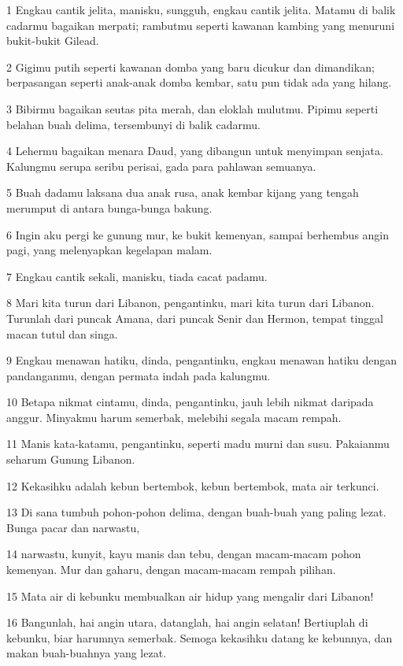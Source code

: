 \par 1 Engkau cantik jelita, manisku, sungguh, engkau cantik jelita. Matamu di balik cadarmu bagaikan merpati; rambutmu seperti kawanan kambing yang menuruni bukit-bukit Gilead.
\par 2 Gigimu putih seperti kawanan domba yang baru dicukur dan dimandikan; berpasangan seperti anak-anak domba kembar, satu pun tidak ada yang hilang.
\par 3 Bibirmu bagaikan seutas pita merah, dan eloklah mulutmu. Pipimu seperti belahan buah delima, tersembunyi di balik cadarmu.
\par 4 Lehermu bagaikan menara Daud, yang dibangun untuk menyimpan senjata. Kalungmu serupa seribu perisai, gada para pahlawan semuanya.
\par 5 Buah dadamu laksana dua anak rusa, anak kembar kijang yang tengah merumput di antara bunga-bunga bakung.
\par 6 Ingin aku pergi ke gunung mur, ke bukit kemenyan, sampai berhembus angin pagi, yang melenyapkan kegelapan malam.
\par 7 Engkau cantik sekali, manisku, tiada cacat padamu.
\par 8 Mari kita turun dari Libanon, pengantinku, mari kita turun dari Libanon. Turunlah dari puncak Amana, dari puncak Senir dan Hermon, tempat tinggal macan tutul dan singa.
\par 9 Engkau menawan hatiku, dinda, pengantinku, engkau menawan hatiku dengan pandanganmu, dengan permata indah pada kalungmu.
\par 10 Betapa nikmat cintamu, dinda, pengantinku, jauh lebih nikmat daripada anggur. Minyakmu harum semerbak, melebihi segala macam rempah.
\par 11 Manis kata-katamu, pengantinku, seperti madu murni dan susu. Pakaianmu seharum Gunung Libanon.
\par 12 Kekasihku adalah kebun bertembok, kebun bertembok, mata air terkunci.
\par 13 Di sana tumbuh pohon-pohon delima, dengan buah-buah yang paling lezat. Bunga pacar dan narwastu,
\par 14 narwastu, kunyit, kayu manis dan tebu, dengan macam-macam pohon kemenyan. Mur dan gaharu, dengan macam-macam rempah pilihan.
\par 15 Mata air di kebunku membualkan air hidup yang mengalir dari Libanon!
\par 16 Bangunlah, hai angin utara, datanglah, hai angin selatan! Bertiuplah di kebunku, biar harumnya semerbak. Semoga kekasihku datang ke kebunnya, dan makan buah-buahnya yang lezat.

